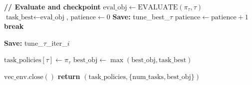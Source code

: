 \documentclass[11pt,a4paper]{article}
\begin{document}
\begin{algorithm}[h]
\begin{algorithmic}[1]
		\EndFor

		\State \textbf{// Evaluate and checkpoint}
			\State $\text{eval\_obj} \leftarrow \text{EVALUATE}(\pi_\tau, \tau)$
				\State $\text{task\_best} \leftarrow \text{eval\_obj}$, $\text{patience} \leftarrow 0$
				\State \textbf{Save:} tune\_best\_$\tau$
			\Else
				\State $\text{patience} \leftarrow \text{patience} + 1$
					\State \textbf{break}
				\EndIf
			\EndIf
		\EndIf

			\State \textbf{Save:} tune\_$\tau$\_iter\_$i$
		\EndIf

	\EndFor

	\State $\text{task\_policies}[\tau] \leftarrow \pi_\tau$
	\State $\text{best\_obj} \leftarrow \max(\text{best\_obj}, \text{task\_best})$

\EndFor

\State $\text{vec\_env.close}()$
\State \textbf{return} $(\text{task\_policies}, \{\text{num\_tasks}, \text{best\_obj}\})$

\end{algorithmic}
\end{algorithm}

\clearpage

\end{document}

